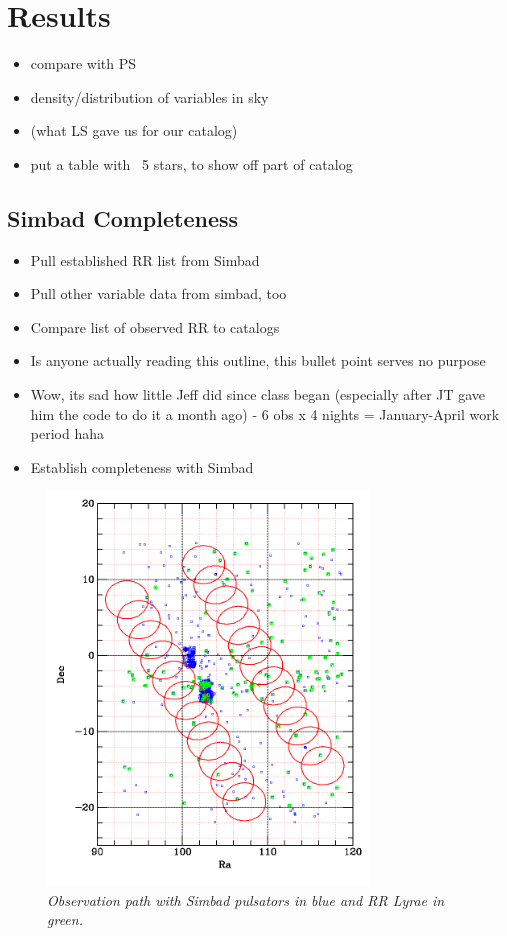 \documentclass[aps,prl,twocolumn,superscriptaddress]{revtex4-1}
\begin{document}
\section{Results}
\begin{itemize}
	\item{} compare with PS
	\item{} density/distribution of variables in sky
	\item{} (what LS gave us for our catalog)
	\item{} put a table with ~5 stars, to show off part of catalog
\end{itemize}

\subsection{Simbad Completeness}
	\begin{itemize}
		\item{} Pull established RR list from Simbad
		\item{} Pull other variable data from simbad, too
		\item{} Compare list of observed RR to catalogs
		\item{} Is anyone actually reading this outline, this bullet point serves no purpose
		\item{} Wow, its sad how little Jeff did since class began (especially after JT gave him the code to do it a month ago) - 6 obs x 4 nights = January-April work period haha
		\item{} Establish completeness with Simbad
	\end{itemize}
\begin{figure}[H]
 \centering
 	\includegraphics[width=3.35in]{figures/simbadoverlap.png}
 \caption{\it \small{Observation path with Simbad pulsators in blue and RR Lyrae in green.}}
 \label{fig:simoverlap}
\end{figure}
\end{document}
